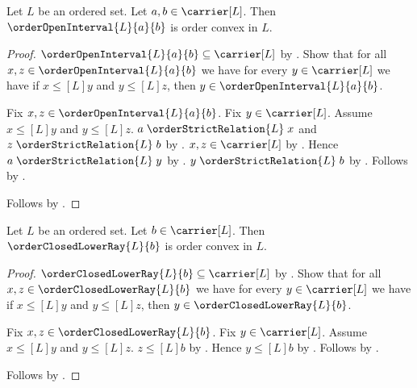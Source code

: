 \begin{proposition}\label{order_open_interval_is_order_convex}
    Let $L$ be an ordered set.
    Let $a,b\in\carrier[L]$.
    Then $\orderOpenInterval{L}{a}{b}$ is order convex in $L$.
\end{proposition}
\begin{proof}
    $\orderOpenInterval{L}{a}{b}\subseteq\carrier[L]$ by
        .
    Show that for all $x,z\in\orderOpenInterval{L}{a}{b}$ we have
        for every $y\in\carrier[L]$ we have if
            $x\mathrel{\leq[L]}y$ and $y\mathrel{\leq[L]}z$, then
            $y\in\orderOpenInterval{L}{a}{b}$.
    \begin{subproof}
        Fix $x,z\in\orderOpenInterval{L}{a}{b}$.
        Fix $y\in\carrier[L]$.
        Assume $x\mathrel{\leq[L]}y$ and $y\mathrel{\leq[L]}z$.
        $a\mathrel{\orderStrictRelation{L}}x$ and
            $z\mathrel{\orderStrictRelation{L}}b$ by
            .
        $x,z\in\carrier[L]$ by .
        Hence $a\mathrel{\orderStrictRelation{L}}y$ by
            .
        $y\mathrel{\orderStrictRelation{L}}b$ by
            .
        Follows by .
    \end{subproof}
    Follows by .
\end{proof}

\begin{proposition}\label{order_closed_lower_ray_is_order_convex}
    Let $L$ be an ordered set.
    Let $b\in\carrier[L]$.
    Then $\orderClosedLowerRay{L}{b}$ is order convex in $L$.
\end{proposition}
\begin{proof}
    $\orderClosedLowerRay{L}{b}\subseteq\carrier[L]$ by
        .
    Show that for all $x,z\in\orderClosedLowerRay{L}{b}$ we have
        for every $y\in\carrier[L]$ we have if
            $x\mathrel{\leq[L]}y$ and $y\mathrel{\leq[L]}z$, then
            $y\in\orderClosedLowerRay{L}{b}$.
    \begin{subproof}
        Fix $x,z\in\orderClosedLowerRay{L}{b}$.
        Fix $y\in\carrier[L]$.
        Assume $x\mathrel{\leq[L]}y$ and $y\mathrel{\leq[L]}z$.
        $z\mathrel{\leq[L]}b$ by .
        Hence $y\mathrel{\leq[L]}b$ by
            .
        Follows by .
    \end{subproof}
    Follows by .
\end{proof}

